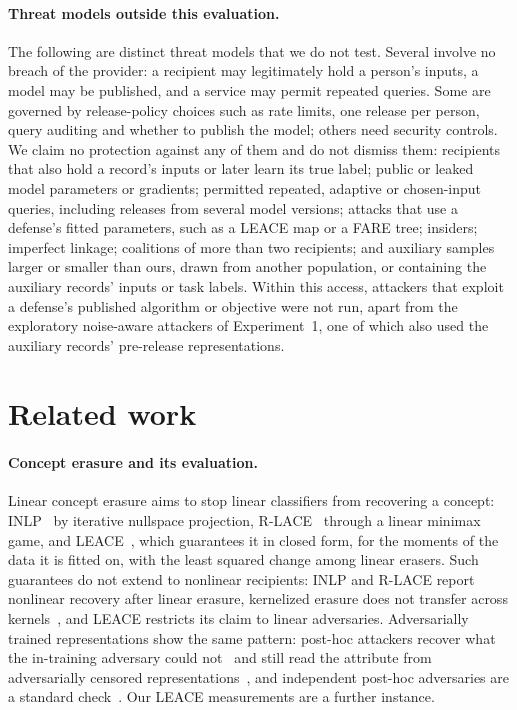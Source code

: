 \documentclass[10pt]{article}
\begin{document}
\paragraph{Threat models outside this evaluation.} The following are distinct threat models that we do not test.
Several involve no breach of the provider: a recipient may legitimately hold a person's inputs, a model may be
published, and a service may permit repeated queries. Some are governed by release-policy choices such as rate limits,
one release per person, query auditing and whether to publish the model; others need security controls. We claim no
protection against any of them and do not dismiss them: recipients that also hold a record's inputs or later learn its
true label; public or leaked model parameters or gradients; permitted repeated, adaptive or chosen-input queries,
including releases from several model versions; attacks that use a defense's fitted parameters, such as a LEACE map or
a FARE tree; insiders; imperfect linkage; coalitions of more than two recipients; and auxiliary samples larger or smaller
than ours, drawn from another population, or containing the auxiliary records' inputs or task labels. Within this
access, attackers that exploit a defense's published algorithm or objective were not run, apart from the exploratory
noise-aware attackers of Experiment~1, one of which also used the auxiliary records' pre-release representations.

\section{Related work}\label{sec:related}

\paragraph{Concept erasure and its evaluation.} Linear concept erasure aims to stop linear classifiers from recovering a
concept: INLP~\citep{ravfogel2020inlp} by iterative nullspace projection, R-LACE~\citep{ravfogel2022rlace} through a
linear minimax game, and LEACE~\citep{belrose2023leace}, which guarantees it in closed form, for the moments of the data it is fitted on,
with the least squared change among linear erasers. Such guarantees do not extend to nonlinear recipients: INLP and R-LACE report nonlinear recovery after
linear erasure, kernelized erasure does not transfer across kernels~\citep{ravfogel2022kernel}, and LEACE restricts its
claim to linear adversaries. Adversarially trained representations show the same pattern: post-hoc attackers recover
what the in-training adversary could not~\citep{elazar2018adversarial} and still read the attribute from adversarially
censored representations~\citep{song2020overlearning}, and independent post-hoc
adversaries are a standard check~\citep{moyer2018invariant}. Our LEACE measurements are a further instance.
\end{document}
